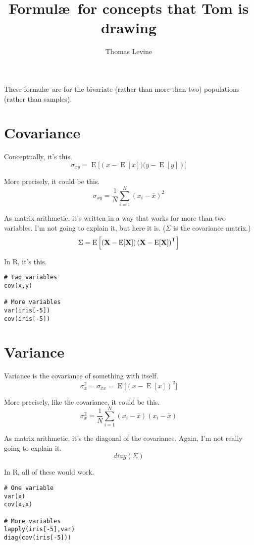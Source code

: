 \documentclass{article}
\title{Formul\ae\ for concepts that Tom is drawing}
\author{Thomas Levine}
\begin{document}
\maketitle

These formul\ae\ are for the bivariate (rather than more-than-two) populations (rather than samples).

\section{Covariance}
Conceptually, it's this.
$$ \sigma_{xy} = \operatorname{E}{\big[\left(x - \operatorname{E}[x])(y - \operatorname{E}[y]\right)\big]} $$

More precisely, it could be this.
$$ \sigma_{xy} = \frac{1}{N}\sum_{i=1}^{N}\left( x_{i}-\bar{x} \right)^2 $$

As matrix arithmetic, it's written in a way that works for more than two variables.
I'm not going to explain it, but here it is. ($\Sigma$ is the covariance matrix.)
$$ \Sigma=\mathrm{E}
\left[
 \left(
  \textbf{X} - \mathrm{E}[\textbf{X}]
   \right)
  \left(
   \textbf{X} - \mathrm{E}[\textbf{X}]
    \right)^{\rm T}
    \right]
$$

In R, it's this.

\begin{verbatim}
# Two variables
cov(x,y)

# More variables
var(iris[-5])
cov(iris[-5])
\end{verbatim}

\section{Variance}
Variance is the covariance of something with itself.
$$ \sigma_{x}^2 = \sigma_{xx} = \operatorname{E}{\big[\left(x - \operatorname{E}[x]\right)^2\big]} $$

More precisely, like the covariance, it could be this.
$$ \sigma_{x}^2 = \frac{1}{N}\sum_{i=1}^{N}\left( x_{i}-\bar{x} \right) \left( x_{i}-\bar{x} \right) $$

As matrix arithmetic, it's the diagonal of the covariance. Again, I'm not really going to explain it.
$$ diag\left(\Sigma\right) $$

In R, all of these would work.
\begin{verbatim}
# One variable
var(x)
cov(x,x)

# More variables
lapply(iris[-5],var)
diag(cov(iris[-5]))
\end{verbatim}
\end{document}
